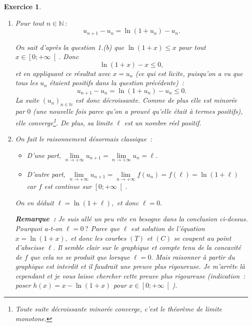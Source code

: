 \documentclass[10pt]{article}
\newtheorem{exo}{Exercice}
\begin{document}
\begin{exo}
\begin{enumerate}
\begin{enumerate}
\begin{itemize}
\end{itemize}
\item Pour tout $n\in\mathbb{N}~:$
\[u_{n+1}-u_n=\ln\left(1+u_n\right)-u_n.\]

\medskip



On sait d'après la question 1.(b) que $\ln(1+x)\leq x$ pour tout $x\in\left[0;+\infty\right[.$ Donc \[\ln(1+x)-x\leq 0,\] et en appliquant ce résultat avec $x=u_n$ (ce qui est licite, puisqu'on a vu que tous les $u_n$ étaient positifs dans la question précédente)~:
\[u_{n+1}-u_n=\ln\left(1+u_n\right)-u_n\leq 0.\] La suite $(u_n)_{n\in\mathbb{N}}$ est donc décroissante. 
Comme de plus elle est minorée par $0$ (une nouvelle fois parce qu'on a prouvé qu'elle était à termes positifs), elle converge\footnote{Toute suite décroissante minorée converge, c'est le théorème de limite monotone.}. De plus, sa limite $\ell$ est un nombre réel positif.
\item On fait le raisonnement désormais classique~:

\begin{itemize}
\item[\textbullet] D'une part, $\lim\limits_{n\to +\infty}u_{n+1}=\lim\limits_{n\to +\infty}u_n=\ell.$
\item[\textbullet] D'autre part, $\lim\limits_{n\to +\infty}u_{n+1}=\lim\limits_{n\to +\infty}f\left(u_n\right)=f(\ell)=\ln(1+\ell)$ car $f$ est continue sur $\left[0;+\infty\right[.$
\end{itemize}

On en déduit $\ell=\ln(1+\ell),$ et donc $\ell=0.$

\medskip

\textbf{Remarque~:} Je suis allé un peu vite en besogne dans la conclusion ci-dessus. Pourquoi a-t-on $\ell =0~?$ Parce que $\ell$ est solution de l'équation $x=\ln(1+x),$ et donc les courbes $(T)$ et $(C)$ se coupent au point d'abscisse $\ell.$ Il semble clair sur le graphique et compte tenu de la concavité de $f$ que cela ne se produit que lorsque $\ell=0.$ Mais raisonner à partir du graphique est interdit et il faudrait une preuve plus rigoureuse. Je m'arrête là cependant et je vous laisse chercher cette preuve plus rigoureuse (indication~: poser $h(x)=x-\ln(1+x)$ pour $x\in \left[0;+\infty\right[$).

\end{enumerate}
\end{enumerate}

\end{exo}
\end{document}
